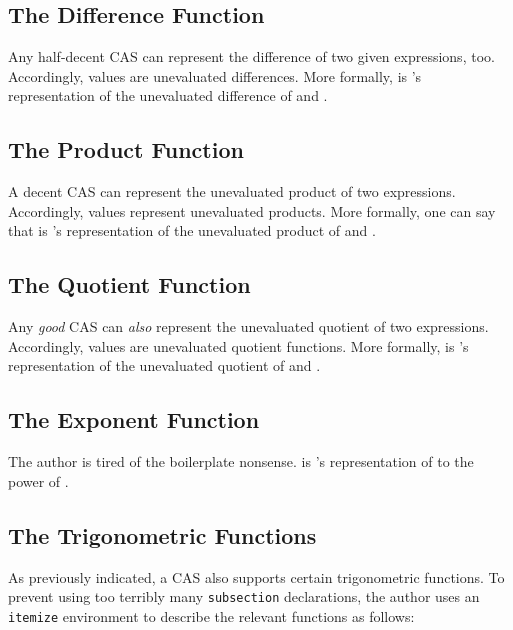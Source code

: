 \documentclass{report}
\begin{document}
\subsection{The Difference Function}
Any half-decent CAS can represent the difference of two given expressions, too.  Accordingly, \AgdaField{\AgdaUnderscore{}-\AgdaUnderscore{}} values are unevaluated differences.  More formally,     is 's representation of the unevaluated difference of  and .

\subsection{The Product Function}
A decent CAS can represent the unevaluated product of two expressions.  Accordingly, \AgdaField{\AgdaUnderscore{}*\AgdaUnderscore{}} values represent unevaluated products.  More formally, one can say that     is 's representation of the unevaluated product of  and .

\subsection{The Quotient Function}
Any \emph{good} CAS can \emph{also} represent the unevaluated quotient of two expressions.  Accordingly, \AgdaField{\AgdaUnderscore{}/\AgdaUnderscore{}} values are unevaluated quotient functions.  More formally,     is 's representation of the unevaluated quotient of  and .

\subsection{The Exponent Function}
The author is tired of the boilerplate nonsense.      is 's representation of  to the power of .

\subsection{The Trigonometric Functions}
As previously indicated, a CAS also supports certain trigonometric functions.  To prevent using too terribly many \texttt{subsection} declarations, the author uses an \texttt{itemize} environment to describe the relevant functions as follows:
\end{document}
